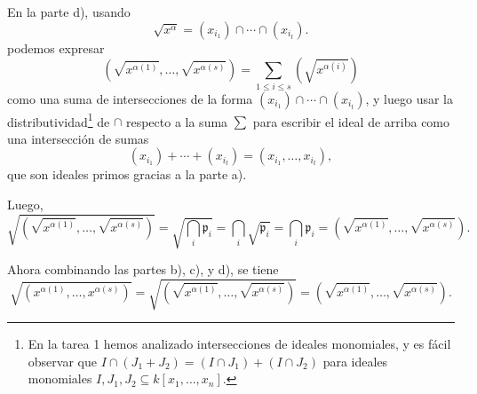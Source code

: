 \documentclass{article}
\theoremstyle{definition}
\begin{document}
En la parte d), usando
$$\sqrt{x^{\alpha}} = (x_{i_1})\cap\cdots\cap (x_{i_t}).$$
podemos expresar
$$(\sqrt{x^{\alpha (1)}}, \ldots, \sqrt{x^{\alpha (s)}}) = \sum_{1\le i\le s} (\sqrt{x^{\alpha (i)}})$$
como una suma de intersecciones de la forma $(x_{i_1})\cap\cdots\cap (x_{i_t})$,
y luego usar la distributividad\footnote{En la tarea 1 hemos analizado
  intersecciones de ideales monomiales, y es fácil observar que
  $I\cap (J_1 + J_2) = (I\cap J_1) + (I \cap J_2)$ para ideales monomiales
  $I,J_1,J_2 \subseteq k [x_1,\ldots,x_n]$.} de $\cap$ respecto a la suma $\sum$
para escribir el ideal de arriba como una intersección de sumas
$$(x_{i_1}) + \cdots + (x_{i_t}) = (x_{i_1},\ldots,x_{i_t}),$$
que son ideales primos gracias a la parte a).

Luego,
\[ \sqrt{(\sqrt{x^{\alpha (1)}}, \ldots, \sqrt{x^{\alpha (s)}})} =
   \sqrt{\bigcap_i \mathfrak{p}_i} =
   \bigcap_i \sqrt{\mathfrak{p}_i} =
   \bigcap_i\mathfrak{p}_i =
   (\sqrt{x^{\alpha (1)}}, \ldots, \sqrt{x^{\alpha (s)}}). \]

Ahora combinando las partes b), c), y d), se tiene
\[ \sqrt{(x^{\alpha (1)}, \ldots, x^{\alpha (s)})} =
   \sqrt{(\sqrt{x^{\alpha (1)}}, \ldots, \sqrt{x^{\alpha (s)}})} =
   (\sqrt{x^{\alpha (1)}}, \ldots, \sqrt{x^{\alpha (s)}}). \]
\fi
\end{document}
